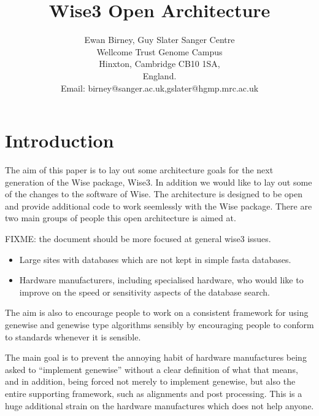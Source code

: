 
\newcommand{\programtext}[1]{{\tt #1}}

\title{Wise3 Open Architecture}
\author{Ewan Birney, Guy Slater
Sanger Centre\\
Wellcome Trust Genome Campus\\
Hinxton, Cambridge CB10 1SA,\\
England.\\
Email: birney@sanger.ac.uk,gslater@hgmp.mrc.ac.uk}

\maketitle
 
\newpage
\tableofcontents
\newpage

\section{Introduction}

The aim of this paper is to lay out some architecture goals for the next generation
of the Wise package, Wise3. In addition we would like to lay out some of the changes
to the software of Wise. The architecture is designed to be open and provide
additional code to work seemlessly with the Wise package. There are two main groups of
people this open architecture is aimed at.

FIXME: the document should be more focused at general wise3 issues.


\begin{itemize}
\item Large sites with databases which are not kept in simple fasta databases.
\item Hardware manufacturers, including specialised hardware, who would like
to improve on the speed or sensitivity aspects of the database search.
\end{itemize}

The aim is also to encourage people to work on a consistent framework for using
genewise and genewise type algorithms sensibly by encouraging people to conform
to standards whenever it is sensible.

The main goal is to prevent the annoying habit of hardware manufactures being
asked to ``implement genewise'' without a clear definition of what that means,
and in addition, being forced not merely to implement genewise, but also the
entire supporting framework, such as alignments and post processing. This is
a huge additional strain on the hardware manufactures which does not help anyone.

